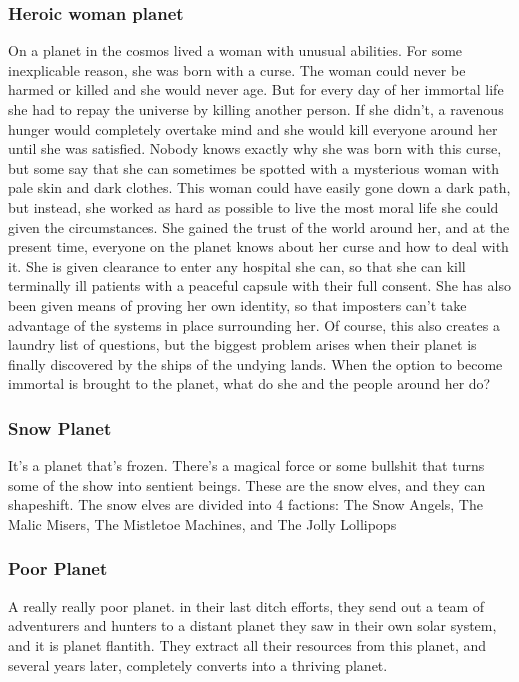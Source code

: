 \documentclass[12pt, titlepage]{article}
\begin{document}
\subsubsection{Heroic woman planet}

On a planet in the cosmos lived a woman with unusual abilities. For some inexplicable reason, she was born with a curse. The woman could never be harmed or killed and she would never age. But for every day of her immortal life she had to repay the universe by killing another person. If she didn't, a ravenous hunger would completely overtake mind and she would kill everyone around her until she was satisfied. Nobody knows exactly why she was born with this curse, but some say that she can sometimes be spotted with a mysterious woman with pale skin and dark clothes. This woman could have easily gone down a dark path, but instead, she worked as hard as possible to live the most moral life she could given the circumstances. She gained the trust of the world around her, and at the present time, everyone on the planet knows about her curse and how to deal with it. She is given clearance to enter any hospital she can, so that she can kill terminally ill patients with a peaceful capsule with their full consent. She has also been given means of proving her own identity, so that imposters can't take advantage of the systems in place surrounding her. Of course, this also creates a laundry list of questions, but the biggest problem arises when their planet is finally discovered by the ships of the undying lands. When the option to become immortal is brought to the planet, what do she and the people around her do? 

\subsubsection{Snow Planet}

It's a planet that's frozen. There's a magical force or some bullshit that turns some of the show into sentient beings. These are the snow elves, and they can shapeshift. The snow elves are divided into 4 factions: The Snow Angels, The Malic Misers, The Mistletoe Machines, and The Jolly Lollipops

\subsubsection{Poor Planet}

A really really poor planet. in their last ditch efforts, they send out a team of adventurers and hunters to a distant planet they saw in their own solar system, and it is planet flantith. They extract all their resources from this planet, and several years later, completely converts into a thriving planet.
\end{document}
